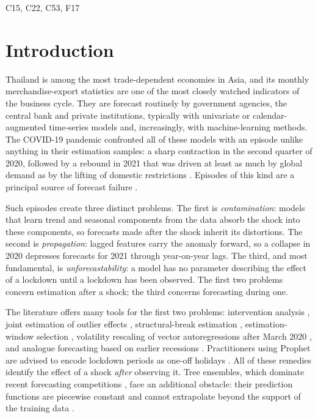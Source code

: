 \documentclass{article}
\theoremstyle{plain}
\theoremstyle{definition}
\theoremstyle{remark}
\begin{document}
\enspace C15, C22, C53, F17

\section{Introduction}\label{sec:intro}
Thailand is among the most trade-dependent economies in Asia, and its monthly merchandise-export statistics are one of the most closely watched indicators of the business cycle. They are forecast routinely by government agencies, the central bank and private institutions, typically with univariate or calendar-augmented time-series models and, increasingly, with machine-learning methods. The COVID-19 pandemic confronted all of these models with an episode unlike anything in their estimation samples: a sharp contraction in the second quarter of 2020, followed by a rebound in 2021 that was driven at least as much by global demand as by the lifting of domestic restrictions \citep{baldwin2020trade}. Episodes of this kind are a principal source of forecast failure \citep{clements1998forecasting, rossi2013instability}.

Such episodes create three distinct problems. The first is \emph{contamination}: models that learn trend and seasonal components from the data absorb the shock into these components, so forecasts made after the shock inherit its distortions. The second is \emph{propagation}: lagged features carry the anomaly forward, so a collapse in 2020 depresses forecasts for 2021 through year-on-year lags. The third, and most fundamental, is \emph{unforecastability}: a model has no parameter describing the effect of a lockdown until a lockdown has been observed. The first two problems concern estimation after a shock; the third concerns forecasting during one.

The literature offers many tools for the first two problems: intervention analysis \citep{box1975intervention}, joint estimation of outlier effects \citep{chen1993joint}, structural-break estimation \citep{bai1998multiple}, estimation-window selection \citep{pesaran2007window}, volatility rescaling of vector autoregressions after March 2020 \citep{lenza2022var}, and analogue forecasting based on earlier recessions \citep{foroni2022covid}. Practitioners using Prophet are advised to encode lockdown periods as one-off holidays \citep{prophetshocks}. All of these remedies identify the effect of a shock \emph{after} observing it. Tree ensembles, which dominate recent forecasting competitions \citep{makridakis2022m5}, face an additional obstacle: their prediction functions are piecewise constant and cannot extrapolate beyond the support of the training data \citep{hastie2009elements, januschowski2022trees}.
\end{document}
